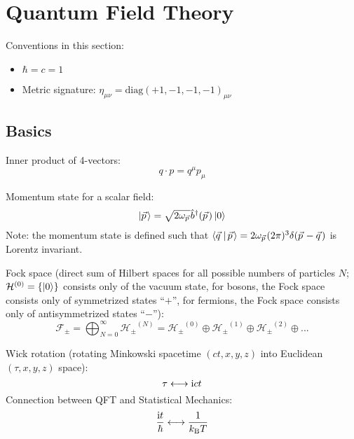 \section{Quantum Field Theory} %

	Conventions in this section:
	\begin{itemize}
		\item $\hbar = c = 1$
		\item Metric signature: $\eta_{\mu\nu} = \mathrm{diag}(+1,-1,-1,-1)_{\mu\nu}$
	\end{itemize}


	\subsection{Basics}
		\noindent
		Inner product of 4-vectors:
		\begin{equation}
			q \cdot p = q^\mu p_\mu
		\end{equation}

		\noindent
		Momentum state for a scalar field:
		\begin{equation}
			\Ket{\vec{p}} = \sqrt{2 \omega_{\vec{p}}} \hat{b}^\dagger(\vec{p}) \Ket{0}
		\end{equation}
		Note: the momentum state is defined such that $\Braket{\vec{q}|\vec{p}} = 2\omega_{\vec{p}} (2\pi)^3 \delta(\vec{p}-\vec{q})$ is Lorentz invariant.

		\noindent
		Fock space (direct sum of Hilbert spaces for all possible numbers of particles $N$; $\mathcal{H}^{(0)} = \qty{\Ket{0}}$ consists only of the vacuum state, for bosons, the Fock space consists only of symmetrized states ``$+$'', for fermions, the Fock space consists only of antisymmetrized states ``$-$''):
		\begin{equation}
			\mathcal{F_\pm}
			= \bigoplus_{N=0}^{\infty} \mathcal{H_\pm}^{(N)}
			= \mathcal{H_\pm}^{(0)} \oplus \mathcal{H_\pm}^{(1)} \oplus \mathcal{H_\pm}^{(2)} \oplus ...
		\end{equation}

		\noindent
		Wick rotation (rotating Minkowski spacetime $(c t,x,y,z)$ into Euclidean $(\tau,x,y,z)$ space):
		\begin{equation}
			\tau \longleftrightarrow \mathrm{i} c t
		\end{equation}
		Connection between QFT and Statistical Mechanics:
		\begin{equation}
			\frac{\mathrm{i} t}{\hbar} \longleftrightarrow \frac{1}{k_{\text{B}} T}
		\end{equation}

